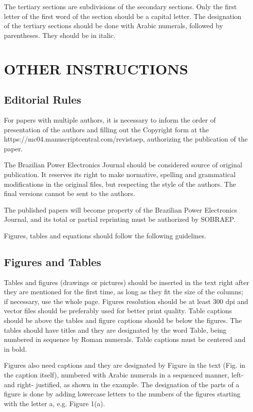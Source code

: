 \documentclass[english]{sobraep}
\begin{document}
The tertiary sections are subdivisions of the secondary sections. Only the first letter of the first word of the section should be a capital letter. The designation of the tertiary sections should be done with Arabic numerals, followed by parentheses. They should be in italic.

\section{OTHER INSTRUCTIONS}

\subsection{Editorial Rules}

For papers with multiple authors, it is necessary to inform the order of presentation of the authors and filling out the Copyright form at the https://mc04.manuscriptcentral.com/revistaep, authorizing the publication of the paper.

The Brazilian Power Electronics Journal should be considered source of original publication. It reserves its right to make normative, spelling and grammatical modifications in the original files, but respecting the style of the authors. The final versions cannot be sent to the authors.

The published papers will become property of the Brazilian Power Electronics Journal, and its total or partial reprinting must be authorized by SOBRAEP.

Figures, tables and equations should follow the following guidelines.

\subsection{Figures and Tables}

Tables and figures (drawings or pictures) should be inserted in the text right after they are mentioned for the first time, as long as they fit the size of the columns; if necessary, use the whole page. Figures resolution should be at least 300 dpi and vector files should be preferably used for better print quality. Table captions should be above the tables and figure captions should be below the figures. The tables should have titles and they are designated by the word Table, being numbered in sequence by Roman numerals. Table captions must be centered and in bold.

Figures also need captions and they are designated by Figure in the text (Fig. in the caption itself), numbered with Arabic numerals in a sequenced manner, left- and right- justified, as shown in the example. The designation of the parts of a figure is done by adding lowercase letters to the numbers of the figures starting with the letter a, e.g. Figure 1(a).
\end{document}
